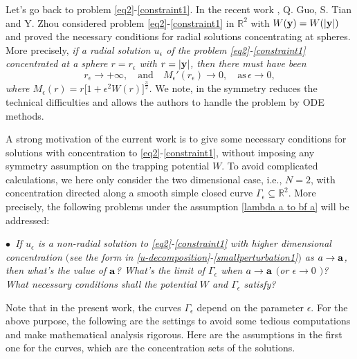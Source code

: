 \documentclass[10pt, reqno]{amsart}
\numberwithin{equation}{section}
\theoremstyle{definition}
\def\G{{\mathfrak G}}
\def\G{\Gamma}
\begin{document}
Let's go back to problem \eqref{eq2}-\eqref{constraint1}.
 In the recent work \cite{Zhouyang}, Q. Guo, S. Tian and Y. Zhou considered problem \eqref{eq2}-\eqref{constraint1} in ${\mathbb R}^2$ with $W({\bf y}) = W(|{\bf y}|)$
and proved the necessary conditions for radial solutions concentrating at spheres.
More precisely,
{\em
 if a radial solution $u_\epsilon$ of the problem \eqref{eq2}-\eqref{constraint1}
concentrated at a sphere $r=r_\epsilon $ with $r=|{\bf y}|$, then there must have been
\[
r_\epsilon \to +\infty, \quad \text{and}\quad M_\epsilon' (r_\epsilon) \to 0, \quad \text{as}\,\epsilon \to 0,
\]
where $M_\epsilon (r) = r\big[1+ \epsilon^2 W(r) \big]^\frac 32$.
}
We note, in \cite{Zhouyang} the symmetry reduces the technical difficulties and allows the authors to handle the problem by ODE methods.



\smallskip
A strong motivation of the current work is to give some necessary conditions for solutions with concentration to \eqref{eq2}-\eqref{constraint1}, without imposing any symmetry assumption on the trapping potential $W$.
To avoid complicated calculations, we here only consider the two dimensional case, i.e., $N=2$,
with concentration directed along a smooth simple closed curve $\Gamma_\epsilon\subseteq{\mathbb R}^2$.
More precisely, the following problems under the assumption \eqref{lambda a to bf a} will be addressed:

\smallskip
{\em
$\bullet$\ If $u_\epsilon$ is a non-radial solution to \eqref{eq2}-\eqref{constraint1} with higher dimensional concentration $($see the form in \eqref{u-decomposition}-\eqref{smallperturbation1}$)$ as $a \to {\bf a}$, then what's the value of ${\bf a}$?
What's the limit of $\G_\epsilon$ when $a\to {\bf a}$ $($or $\epsilon \to 0$ $)$?
What necessary conditions shall the potential $W$ and $\G_\epsilon$ satisfy?
}





\medskip
Note that in the present work, the curves $\G_\epsilon$ depend on the parameter $\epsilon$.
For the above purpose, the following are the settings to avoid some tedious computations and make mathematical analysis rigorous.
Here are the assumptions in the first one for the curves, which are the concentration sets of the solutions.
\end{document}

